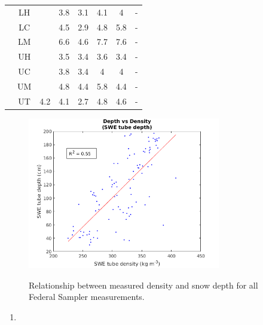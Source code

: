 \documentclass[12pt]{article}
\begin{document}
\begin{table}[]
\begin{tabular}{cccccccc}
\rowcolor[HTML]{EFEFEF} 
\cellcolor[HTML]{EFEFEF} & LH & \cellcolor[HTML]{EFEFEF} & 3.8 & 3.1 & 4.1 & 4 & - \\
\rowcolor[HTML]{EFEFEF} 
\cellcolor[HTML]{EFEFEF} & LC & \cellcolor[HTML]{EFEFEF} & 4.5 & 2.9 & 4.8 & 5.8 & - \\
\rowcolor[HTML]{EFEFEF} 
\cellcolor[HTML]{EFEFEF} & LM & \cellcolor[HTML]{EFEFEF} & 6.6 & 4.6 & 7.7 & 7.6 & - \\
\rowcolor[HTML]{EFEFEF} 
\cellcolor[HTML]{EFEFEF} & UH & \cellcolor[HTML]{EFEFEF} & 3.5 & 3.4 & 3.6 & 3.4 & - \\
\rowcolor[HTML]{EFEFEF} 
\cellcolor[HTML]{EFEFEF} & UC & \cellcolor[HTML]{EFEFEF} & 3.8 & 3.4 & 4 & 4 & - \\
\rowcolor[HTML]{EFEFEF} 
\cellcolor[HTML]{EFEFEF} & UM & \cellcolor[HTML]{EFEFEF} & 4.8 & 4.4 & 5.8 & 4.4 & - \\
\rowcolor[HTML]{EFEFEF} 
\multirow{-7}{*}{\cellcolor[HTML]{EFEFEF}G13} & UT & \multirow{-7}{*}{\cellcolor[HTML]{EFEFEF}4.2} & 4.1 & 2.7 & 4.8 & 4.6 & - \\
\end{tabular}
\end{table}


\begin{figure} 
	\centering
	\includegraphics[width =0.75\textwidth]{DepthDensity_SWEtube.png}\\
	\caption{Relationship between measured density and snow depth for all Federal Sampler measurements.}
	\label{fig:tube_depth}
\end{figure}

\begin{enumerate}
\item 
\end{enumerate}
\end{document}
